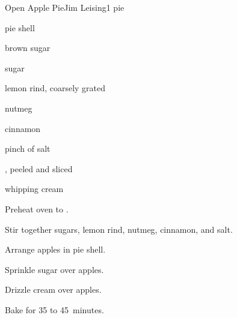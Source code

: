 \begin{recipe}{Open Apple Pie}{Jim Leising}{1 pie}

\begin{ingredients}
\item pie shell
\item \C{\half} brown sugar
\item \C{\half} sugar
\item {} lemon rind, coarsely grated
\item \tp{\half} nutmeg
\item \tp{\half} cinnamon
\item pinch of salt
\item {} , peeled and sliced
\item \C{\third} whipping cream
\end{ingredients}

\begin{directions}
\item Preheat oven to .
\item Stir together sugars, lemon rind, nutmeg, cinnamon, and salt.
\item Arrange apples in pie shell.
\item Sprinkle sugar over apples.
\item Drizzle cream over apples.
\item Bake for 35 to 45~minutes.
\end{directions}

\end{recipe}
